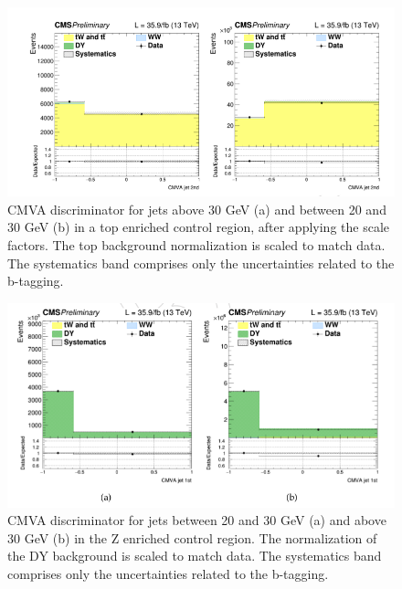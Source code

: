\begin{figure}
\centering
\includegraphics[scale= 0.4]{../Cap4/cmvaT}
\caption{CMVA discriminator for jets above 30 GeV (a) and between 20 and 30 GeV (b) in a
top enriched control region, after applying the scale factors. The top background normalization
is scaled to match data. The systematics band comprises only the uncertainties related to the b-tagging.}
\label{cmvaT}
\end{figure}

\begin{figure}
\centering
\includegraphics[scale= 0.4]{../Cap4/cmvaD}
\caption{CMVA discriminator for jets between 20 and 30 GeV (a) and above 30 GeV (b) in the
Z enriched control region. The normalization of the DY background is scaled to match data.
The systematics band comprises only the uncertainties related to the b-tagging.}
\label{cmvaD}
\end{figure}

